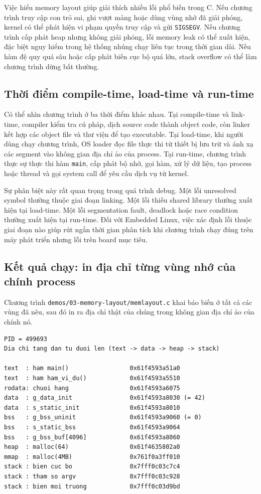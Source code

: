 \documentclass[11pt]{article}
\newcommand{\code}[1]{\texttt{#1}}
\begin{document}
Việc hiểu memory layout giúp giải thích nhiều lỗi phổ biến trong C. Nếu chương trình truy cập con trỏ sai, ghi vượt mảng hoặc dùng vùng nhớ đã giải phóng, kernel có thể phát hiện vi phạm quyền truy cập và gửi \code{SIGSEGV}. Nếu chương trình cấp phát heap nhưng không giải phóng, lỗi memory leak có thể xuất hiện, đặc biệt nguy hiểm trong hệ thống nhúng chạy liên tục trong thời gian dài. Nếu hàm đệ quy quá sâu hoặc cấp phát biến cục bộ quá lớn, stack overflow có thể làm chương trình dừng bất thường.

\subsection{Thời điểm compile-time, load-time và run-time}

Có thể nhìn chương trình ở ba thời điểm khác nhau. Tại compile-time và link-time, compiler kiểm tra cú pháp, dịch source code thành object code, còn linker kết hợp các object file và thư viện để tạo executable. Tại load-time, khi người dùng chạy chương trình, OS loader đọc file thực thi từ thiết bị lưu trữ và ánh xạ các segment vào không gian địa chỉ ảo của process. Tại run-time, chương trình thực sự thực thi hàm \code{main}, cấp phát bộ nhớ, gọi hàm, xử lý dữ liệu, tạo process hoặc thread và gọi system call để yêu cầu dịch vụ từ kernel.

Sự phân biệt này rất quan trọng trong quá trình debug. Một lỗi unresolved symbol thường thuộc giai đoạn linking. Một lỗi thiếu shared library thường xuất hiện tại load-time. Một lỗi segmentation fault, deadlock hoặc race condition thường xuất hiện tại run-time. Đối với Embedded Linux, việc xác định lỗi thuộc giai đoạn nào giúp rút ngắn thời gian phân tích khi chương trình chạy đúng trên máy phát triển nhưng lỗi trên board mục tiêu.

\subsection{Kết quả chạy: in địa chỉ từng vùng nhớ của chính process}

Chương trình \code{demos/03-memory-layout/memlayout.c} khai báo biến ở tất cả các vùng đã nêu, sau đó in ra địa chỉ thật của chúng trong không gian địa chỉ ảo của chính nó.

\begin{lstlisting}[caption={Địa chỉ các vùng nhớ của một process đang chạy}]
PID = 499693
Dia chi tang dan tu duoi len (text -> data -> heap -> stack)

text  : ham main()                 0x61f4593a51a0
text  : ham ham_vi_du()            0x61f4593a5510
rodata: chuoi hang                 0x61f4593a6075
data  : g_data_init                0x61f4593a8030 (= 42)
data  : s_static_init              0x61f4593a8010
bss   : g_bss_uninit               0x61f4593a9060 (= 0)
bss   : s_static_bss               0x61f4593a9064
bss   : g_bss_buf[4096]            0x61f4593a8060
heap  : malloc(64)                 0x61f4635802a0
mmap  : malloc(4MB)                0x761f0a3ff010
stack : bien cuc bo                0x7fff0c03c7c4
stack : tham so argv               0x7fff0c03c928
stack : bien moi truong            0x7fff0c03d9bd
\end{lstlisting}
\end{document}
